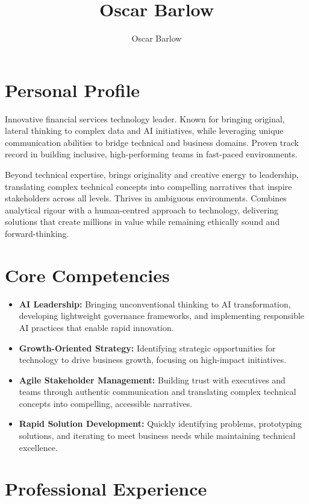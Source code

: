 \documentclass[a4paper]{scrartcl}
\author{Oscar Barlow}
\title{Oscar Barlow}
\date{}
\begin{document}
\maketitle

\section*{Personal Profile}
 { %
  \setlength{\parskip}{6pt plus 2pt minus 1pt}
  Innovative financial services technology leader. Known for bringing original, lateral thinking to complex data and AI initiatives, while leveraging unique communication abilities to bridge technical and business domains. Proven track record in building inclusive, high-performing teams in fast-paced environments.

  Beyond technical expertise, brings originality and creative energy to leadership, translating complex technical concepts into compelling narratives that inspire stakeholders across all levels. Thrives in ambiguous environments. Combines analytical rigour with a human-centred approach to technology, delivering solutions that create millions in value while remaining ethically sound and forward-thinking.
 } %

\section*{Core Competencies}
\begin{itemize}
	\item \textbf{AI Leadership:} Bringing unconventional thinking to AI transformation, developing lightweight governance frameworks, and implementing responsible AI practices that enable rapid innovation.
	\item \textbf{Growth-Oriented Strategy:} Identifying strategic opportunities for technology to drive business growth, focusing on high-impact initiatives.
	\item \textbf{Agile Stakeholder Management:} Building trust with executives and teams through authentic communication and translating complex technical concepts into compelling, accessible narratives.
	\item \textbf{Rapid Solution Development:} Quickly identifying problems, prototyping solutions, and iterating to meet business needs while maintaining technical excellence.
\end{itemize}

\section*{Professional Experience}
\end{document}
